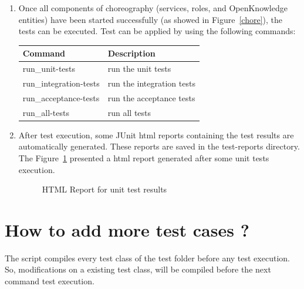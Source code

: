 \documentclass{article}	%
\begin{document}
\begin{enumerate}
  \item Once all components of choreography (services, roles, and OpenKnowledge entities) have been started successfully (as showed in Figure~\ref{chore}), the tests can be executed. Test can be applied by using the following commands:

  \begin{table}[htb]
  \centering
 \begin{tabular}{|l|l|}
  \hline
  Command & Description \\
  \hline
  \hline
  run\_unit-tests & run the unit tests\\
  run\_integration-tests & run the integration tests \\
  run\_acceptance-tests & run the acceptance tests \\
  run\_all-tests & run all tests \\
  \hline
  \end{tabular}

  \end{table}
\newpage
  \item After test execution, some JUnit html reports containing the test results are automatically generated. These reports are saved in the test-reports directory. The Figure~\ref{test-report} presented a html report generated after some unit tests execution.

  \begin{figure}[htbp]
  \centering
  \setlength\fboxrule{1.0pt}
  \caption{HTML Report for unit test results }
  \label{test-report}
  \end{figure}

\end{enumerate}


\section{ How to add more test cases ? }
The script compiles every test class of the test folder before any test execution. So, modifications on a existing test class, will be compiled before the next command test execution.
\end{document}
